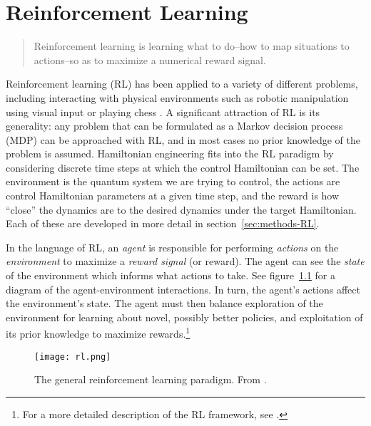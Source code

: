 
\chapter{Reinforcement Learning}



\begin{quote}
    Reinforcement learning is learning what to do--how to map situations to actions--so as to maximize a numerical reward signal. \cite{sutton2018reinforcement}
\end{quote}
Reinforcement learning  (RL) has been applied to a variety of different problems, including interacting with physical environments such as robotic manipulation using visual input \cite{lillicrap2015continuous} or playing chess \cite{Silver1140}. A significant attraction of RL is its generality: any problem that can be formulated as a Markov decision process (MDP) can be approached with RL, and in most cases no prior knowledge of the problem is assumed.
Hamiltonian engineering
fits into
the RL paradigm by considering discrete time steps at which the control Hamiltonian can be set.
The environment is the quantum system we are trying to control, the actions are control Hamiltonian parameters at a given time step,
and the reward is how ``close'' the dynamics are to the desired dynamics under the target Hamiltonian. Each of these are developed in more detail in section~\ref{sec:methods-RL}.

In the language of RL, an \emph{agent} is responsible for performing \emph{actions} on the \emph{environment} to maximize a \emph{reward signal} (or reward). The agent can see the \emph{state} of the environment which informs what actions to take. See figure~\ref{fig:RL} for a diagram of the agent-environment interactions. In turn, the agent's actions affect the environment's state. The agent must then balance exploration of the environment for learning about novel, possibly better policies, and exploitation of its prior knowledge to maximize rewards.\footnote{
For a more detailed description of the RL framework, see \cite{sutton2018reinforcement}.
}

\begin{figure}[H]
    \centering
    \texttt{[image: rl.png]}
    \caption{The general reinforcement learning paradigm. From \cite{sutton2018reinforcement}.}
    \label{fig:RL}
\end{figure}

